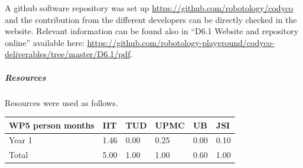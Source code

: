 \documentclass[12pt,a4paper,twoside]{article}
\begin{document}
A github software repository was set up \url{https://github.com/robotology/codyco} and the contribution from the different developers can be directly checked in the website. Relevant information can be found also in ``D6.1 Website and repository online'' available here: \url{https://github.com/robotology-playground/codyco-deliverables/tree/master/D6.1/pdf}.

\subparagraph{Resources}

Resources were used as follows.

\begin{center}
\begin{tabular}{|C{1.5cm}|C{1.5cm}|C{1.5cm}|C{2cm}|C{2cm}|C{2cm}|}
\hline
\footnotesize \textbf{WP5 person months}& \footnotesize \textbf{IIT}&\footnotesize \textbf{TUD}&\footnotesize \textbf{UPMC}& \footnotesize \textbf{UB} &\footnotesize \textbf{JSI}\\ \hline
\footnotesize Year 1 &  1.46 & 0.00 & 0.25 & 0.00 & 0.10      \\  \hline
\footnotesize Total &  5.00	 & 1.00 & 1.00 & 0.60 & 1.00 \\ \hline
\end{tabular}
\end{center}

\end{document}
